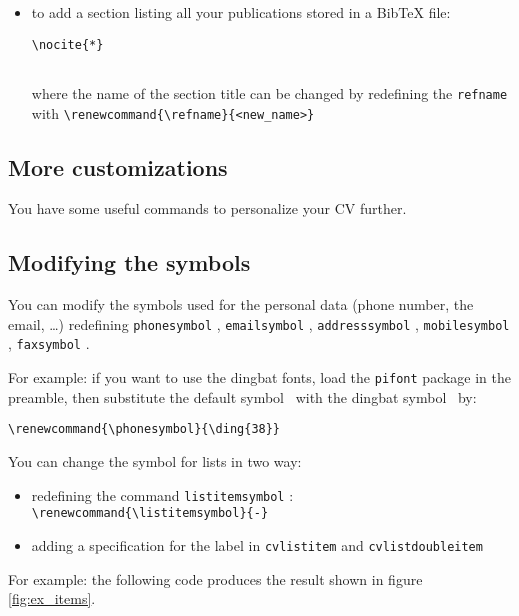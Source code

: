 \documentclass[a4paper,11pt]{article}
\newcommand{\Code}[1]{\lstinline!#1! } %
\begin{document}
\begin{itemize}
 \begin{verbatim}
\cvlistdoubleitem{point1}{point2}
 \end{verbatim}
 \item to add a section listing all your publications stored in a BibTeX file:
 \begin{verbatim}
\nocite{*}


 \end{verbatim}
\vspace{-20pt}
 where the name of the section title can be changed by redefining the \Code{refname} with  \verb|\renewcommand{\refname}{<new_name>}|
\end{itemize}

\subsection{More customizations}

You have some useful commands to personalize your CV further.

\subsection*{Modifying the symbols}
You can modify the symbols used for the personal data (phone number, the email, \ldots) redefining \Code{phonesymbol}, \Code{emailsymbol}, \Code{addresssymbol}, \Code{mobilesymbol}, \Code{faxsymbol}.

For example: if you want to use the dingbat fonts, load the \Code{pifont} package in the preamble, then substitute the default symbol \Telefon\ with the dingbat symbol \ by:
\begin{verbatim}
\renewcommand{\phonesymbol}{\ding{38}}
\end{verbatim} 

You can change the symbol for lists in two way:
\begin{itemize}
 \item redefining the command \Code{listitemsymbol}: \verb|\renewcommand{\listitemsymbol}{-}|
 \item adding a specification for the label in \Code{cvlistitem} and \Code{cvlistdoubleitem}
\end{itemize}

For example: the  following code produces the result shown in figure \ref{fig:ex_items}.
\end{document}
